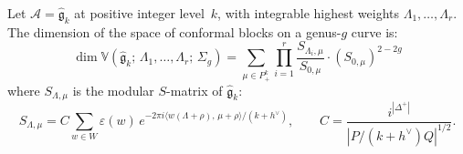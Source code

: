 \begin{theorem}
\label{thm:verlinde-bar}
Let $\mathcal{A} = \widehat{\mathfrak{g}}_k$ at positive integer
level~$k$, with integrable highest weights
$\Lambda_1, \ldots, \Lambda_r$.  The dimension of the space of
conformal blocks on a genus-$g$ curve is:
\begin{equation}\label{eq:verlinde}
\dim \mathbb{V}(\widehat{\mathfrak{g}}_k;\,
\Lambda_1, \ldots, \Lambda_r;\, \Sigma_g)
= \sum_{\mu \in P_+^k}
\prod_{i=1}^r \frac{S_{\Lambda_i,\mu}}{S_{0,\mu}}
\cdot (S_{0,\mu})^{2-2g}
\end{equation}
where $S_{\Lambda,\mu}$ is the modular $S$-matrix of
$\widehat{\mathfrak{g}}_k$\textup{:}
\[
S_{\Lambda,\mu}
= C \sum_{w \in W} \varepsilon(w)\,
e^{-2\pi i \langle w(\Lambda + \rho),\, \mu + \rho \rangle/(k + h^\vee)},
\qquad
C = \frac{i^{|\Delta^+|}}{|P/(k+h^\vee)Q|^{1/2}}.
\]
\end{theorem}

